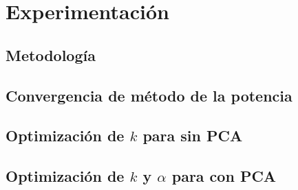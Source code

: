 \section{Experimentación}%
\label{sec:experimentacion}

\subsection{Metodología}%
\label{sub:metodologia}

\subsection{Convergencia de método de la potencia}%
\label{sub:pm}


\subsection{Optimización de $k$ para \knn{} sin PCA}%
\label{sub:knn_sin_pca}

\subsection{Optimización de $k$ y $\alpha$ para \knn{} con PCA}%
\label{sub:alpha_k_knn_pca}

